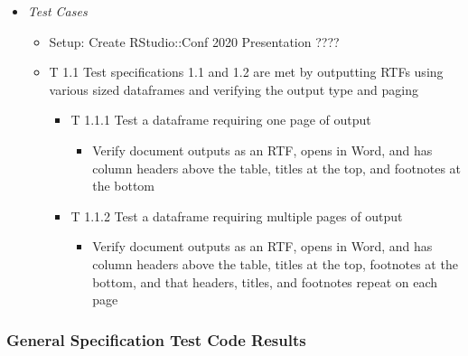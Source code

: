 \documentclass[]{article}
\providecommand{\tightlist}{%
  \setlength{\itemsep}{0pt}\setlength{\parskip}{0pt}}
\begin{document}
\begin{itemize}
\item
  \emph{Test Cases}

  \begin{itemize}
  \item
    Setup: Create RStudio::Conf 2020 Presentation ????
  \item
    T 1.1 Test specifications 1.1 and 1.2 are met by outputting RTFs
    using various sized dataframes and verifying the output type and
    paging

    \begin{itemize}
    \tightlist
    \item
      T 1.1.1 Test a dataframe requiring one page of output

      \begin{itemize}
      \tightlist
      \item
        Verify document outputs as an RTF, opens in Word, and has column
        headers above the table, titles at the top, and footnotes at the
        bottom
      \end{itemize}
    \item
      T 1.1.2 Test a dataframe requiring multiple pages of output

      \begin{itemize}
      \tightlist
      \item
        Verify document outputs as an RTF, opens in Word, and has column
        headers above the table, titles at the top, footnotes at the
        bottom, and that headers, titles, and footnotes repeat on each
        page
      \end{itemize}
    \end{itemize}
  \end{itemize}
\end{itemize}

\hypertarget{general-specification-test-code-results}{%
\subsubsection{General Specification Test Code
Results}\label{general-specification-test-code-results}}
\end{document}
